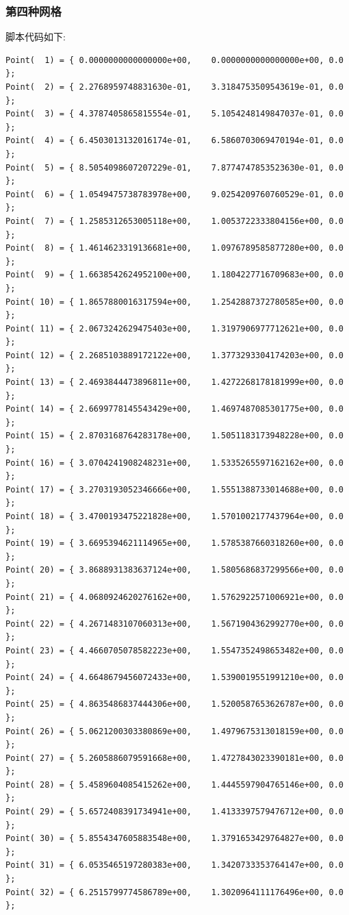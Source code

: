 \documentclass[12pt]{article}
\begin{document}
\begin{CJK}{UTF8}{gkai}
\subsubsection{第四种网格}
脚本代码如下:\\
\begin{verbatim}
Point(  1) = { 0.0000000000000000e+00,    0.0000000000000000e+00, 0.0 };
Point(  2) = { 2.2768959748831630e-01,    3.3184753509543619e-01, 0.0 };
Point(  3) = { 4.3787405865815554e-01,    5.1054248149847037e-01, 0.0 };
Point(  4) = { 6.4503013132016174e-01,    6.5860703069470194e-01, 0.0 };
Point(  5) = { 8.5054098607207229e-01,    7.8774747853523630e-01, 0.0 };
Point(  6) = { 1.0549475738783978e+00,    9.0254209760760529e-01, 0.0 };
Point(  7) = { 1.2585312653005118e+00,    1.0053722333804156e+00, 0.0 };
Point(  8) = { 1.4614623319136681e+00,    1.0976789585877280e+00, 0.0 };
Point(  9) = { 1.6638542624952100e+00,    1.1804227716709683e+00, 0.0 };
Point( 10) = { 1.8657880016317594e+00,    1.2542887372780585e+00, 0.0 };
Point( 11) = { 2.0673242629475403e+00,    1.3197906977712621e+00, 0.0 };
Point( 12) = { 2.2685103889172122e+00,    1.3773293304174203e+00, 0.0 };
Point( 13) = { 2.4693844473896811e+00,    1.4272268178181999e+00, 0.0 };
Point( 14) = { 2.6699778145543429e+00,    1.4697487085301775e+00, 0.0 };
Point( 15) = { 2.8703168764283178e+00,    1.5051183173948228e+00, 0.0 };
Point( 16) = { 3.0704241908248231e+00,    1.5335265597162162e+00, 0.0 };
Point( 17) = { 3.2703193052346666e+00,    1.5551388733014688e+00, 0.0 };
Point( 18) = { 3.4700193475221828e+00,    1.5701002177437964e+00, 0.0 };
Point( 19) = { 3.6695394621114965e+00,    1.5785387660318260e+00, 0.0 };
Point( 20) = { 3.8688931383637124e+00,    1.5805686837299566e+00, 0.0 };
Point( 21) = { 4.0680924620276162e+00,    1.5762922571006921e+00, 0.0 };
Point( 22) = { 4.2671483107060313e+00,    1.5671904362992770e+00, 0.0 };
Point( 23) = { 4.4660705078582223e+00,    1.5547352498653482e+00, 0.0 };
Point( 24) = { 4.6648679456072433e+00,    1.5390019551991210e+00, 0.0 };
Point( 25) = { 4.8635486837444306e+00,    1.5200587653626787e+00, 0.0 };
Point( 26) = { 5.0621200303380869e+00,    1.4979675313018159e+00, 0.0 };
Point( 27) = { 5.2605886079591668e+00,    1.4727843023390181e+00, 0.0 };
Point( 28) = { 5.4589604085415262e+00,    1.4445597904765146e+00, 0.0 };
Point( 29) = { 5.6572408391734941e+00,    1.4133397579476712e+00, 0.0 };
Point( 30) = { 5.8554347605883548e+00,    1.3791653429764827e+00, 0.0 };
Point( 31) = { 6.0535465197280383e+00,    1.3420733353764147e+00, 0.0 };
Point( 32) = { 6.2515799774586789e+00,    1.3020964111176496e+00, 0.0 };

\end{verbatim}
\end{CJK}
\end{document}
